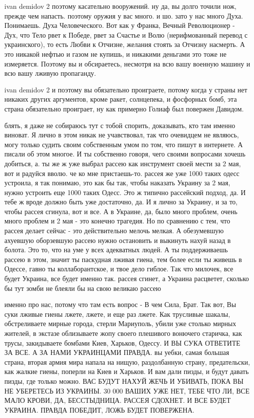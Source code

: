 ivan demidov 2 поэтому касательно вооружений. ну да, вы долго точили нож,
прежде чем напасть. поэтому оружия у вас много. и шо. зато у нас много Духа.
Понимаешь. Духа Человеческого. Вот как у Франка, Вечный Революционер - Дух, что
Тело рвет к Победе, рвет за Счастье и Волю (нерифмованный перевод с
украинского), то есть Любви к Отчизне, желания стоять за Отчизну насмерть. А
это никакой нефтью и газом не купишь, и никакими деньгами это тоже не
измеряется. Поэтому вы и обсираетесь, несмотря на всю вашу военную машину и всю
вашу лживую пропаганду.

ivan demidov 2 и поэтому вы обязательно проиграете, потому когда у страны нет
никаких других аргументов, кроме ракет, солнцепека, и фосфорных бомб, эта
страна обязательно проиграет, ну как примерно Голиаф был повержен Давидом.

блять, я даже не собираюсь тут с тобой спорить, доказывать, кто там именно
виноват. Я лично в этом никак не учавствовал, так что очевидцем не являюсь,
могу только судить своим собственным умом по том, что пишут в интернете. А
писали об этом многое. И ты собственно говоря, чего своими вопросами хочешь
добиться, а. ты же ж уже выбрал рассею как инструмент своей мести за 2 мая, вот
и радуйся вволю. че ко мне пристаешь-то. рассея же уже 1000 таких одесс
устроила, я так понимаю, это как бы так, чтобы наказать Украину за 2 мая, нужно
устроить еще 1000 таких Одесс. Это ж типично рассейский подход, да. И тебе ж
вроде должно быть уже достаточно, да. И я лично за Украину, и за то, чтобы
рассея сгинула, вот и все. А в Украине, да, было много проблем, очень много
проблем и 2 мая - это конечно трагедия. Но по сравнению с тем, что рассея
делает сейчас - это действительно мелочь мелкая. А обезумевшую ахуевшую
оборзевшую рассею нужно остановить и выкинуть нахуй назад в болота. Это то, что
на уме у всех адекватных людей. А ты поддерживаешь рассею в этом, значит ты
паскудная лживая гиена, тем более если ты живешь в Одессе, гавно ты
коллаборантское, и твое дело гиблое. Так что милочек, все будет Украина, все
будет именно так. рассея сгинет, а Украина расцветет, сколько бы тут зомби не
блеяли бы на свою великаю рассею

именно про нас, потому что там есть вопрос - В чем Сила, Брат. Так вот, Вы суки
лживые гиены лжете, лжете, и еще раз лжете. Как трусливые шакалы, обстреливаете мирные города, стерли Мариуполь,
убили уже столько мирных жителей, в экстазе облизываете жопу своего плешивого вонючего старичка,
как трусы, закидываете бомбами Киев, Харьков, Одессу. И ВЫ СУКА ОТВЕТИТЕ ЗА ВСЕ. 
А ЗА НАМИ УКРАИНЦАМИ ПРАВДА. вы уебки, самая большая страна, вторая армия мира напала на нищую, раздолбанную страну,
предательски, как жалкие гиены, поперли на Киев и Харьков. И вам дали пизды, и будут давать пизды, где только можно.
ВАС БУДУТ НАХУЙ ЖЕЧЬ И УБИВАТЬ, ПОКА ВЫ НЕ УБЕРЕТЕСЬ ИЗ УКРАИНЫ. 30 000 ВАШИХ УЖЕ НЕТ, ТЕБЕ ЧТО ЛИ, ВСЕ МАЛО КРОВИ, ДА, БЕССТЫДНИЦА. РАССЕЯ СДОХНЕТ. И ВСЕ БУДЕТ УКРАИНА. ПРАВДА ПОБЕДИТ, ЛОЖЬ БУДЕТ ПОВЕРЖЕНА.

